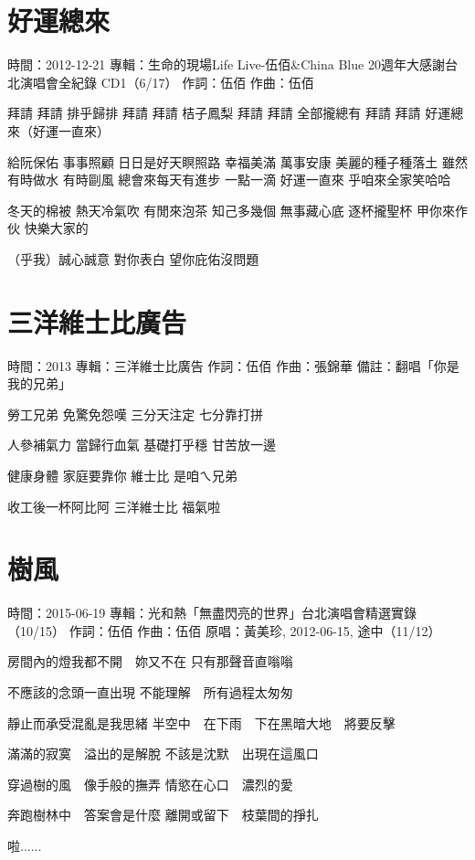 \documentclass[UTF8,a4paper,oneside,twocolumn,12pt]{ctexbook}
\newcommand{\infopair}[2]{\textbullet #1：#2}
\newcommand{\zc}[1][伍佰]{\infopair{作詞}{#1}}
\newcommand{\zq}[1][伍佰]{\infopair{作曲}{#1}}
\newcommand{\zj}[1]{\infopair{專輯}{#1}}
\newcommand{\yc}[1]{\infopair{原唱}{#1}}
\newcommand{\sj}[1]{\infopair{時間}{#1}}
\newcommand{\bz}[1]{\infopair{備註}{#1}}
\newenvironment{info}{\begin{flushleft}\kaishu
	}
	{\end{flushleft}\normalsize\yahei\par}
\newenvironment{lyric}{
	}
{}
\begin{document}
\section{好運總來}
\begin{info}
	\sj{2012-12-21}
	\zj{生命的現場Life Live-伍佰\&China Blue 20週年大感謝台北演唱會全紀錄 CD1（6/17）}
	\zc
	\zq
\end{info}
\begin{lyric}
	拜請 拜請 排乎歸排
	拜請 拜請 桔子鳳梨
	拜請 拜請 全部攏總有
	拜請 拜請 好運總來（好運一直來）

	給阮保佑 事事照顧 日日是好天瞑照路
	幸福美滿 萬事安康 美麗的種子種落土
	雖然有時做水 有時剾風 總會來每天有進步
	一點一滴 好運一直來 乎咱來全家笑哈哈

	冬天的棉被 熱天冷氣吹 有閒來泡茶 知己多幾個
	無事藏心底 逐杯攏聖杯 甲你來作伙 快樂大家的

	（乎我）誠心誠意 對你表白 望你庇佑沒問題
\end{lyric}

\section{三洋維士比廣告} %
\begin{info}
	\sj{2013}
	\zj{三洋維士比廣告}
	\zc[伍佰]
	\zq[張錦華]
	\bz{翻唱「你是我的兄弟」}
\end{info}
\begin{lyric}
	勞工兄弟 免驚免怨嘆
	三分天注定 七分靠打拼

	人參補氣力 當歸行血氣
	基礎打乎穩 甘苦放一邊

	健康身體 家庭要靠你
	維士比 是咱ㄟ兄弟

	收工後一杯阿比阿 三洋維士比 福氣啦
\end{lyric}

\section{樹風}
\begin{info}
	\sj{2015-06-19}
	\zj{光和熱「無盡閃亮的世界」台北演唱會精選實錄（10/15）}
	\zc
	\zq
	\yc{黃美珍, 2012-06-15, 途中（11/12）}
\end{info}
\begin{lyric}
	房間內的燈我都不開　妳又不在
	只有那聲音直嗡嗡

	不應該的念頭一直出現
	不能理解　所有過程太匆匆

	靜止而承受混亂是我思緒
	半空中　在下雨　下在黑暗大地　將要反擊

	滿滿的寂寞　溢出的是解脫
	不該是沈默　出現在這風口

	穿過樹的風　像手般的撫弄
	情慾在心口　濃烈的愛

	奔跑樹林中　答案會是什麼
	離開或留下　枝葉間的掙扎

	啦......
\end{lyric}
\end{document}
